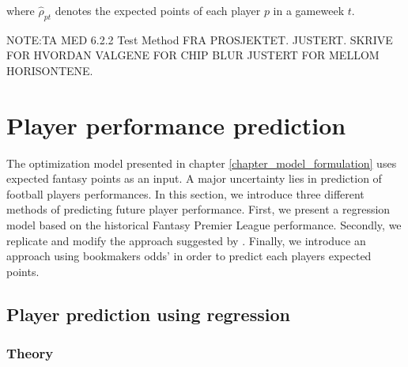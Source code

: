 where $\hat{\rho}_{pt}$ denotes the expected points of each player $p$ in a gameweek $t$.

\newpar

NOTE:TA MED 6.2.2 Test Method FRA PROSJEKTET. JUSTERT. SKRIVE FOR HVORDAN VALGENE FOR CHIP BLUR JUSTERT FOR MELLOM HORISONTENE.


\section{Player performance prediction}
The optimization model presented in chapter \ref{chapter_model_formulation} uses expected fantasy points as an input. A major uncertainty lies in prediction of football players performances. In this section, we introduce three different methods of predicting future player performance. First, we present a regression model based on the historical Fantasy Premier League performance. Secondly, we replicate and modify the approach suggested by \cite{Bonomo}. Finally, we introduce an approach using bookmakers odds' in order to predict each players expected points. 

\subsection{Player prediction using regression}

\subsubsection{Theory}

